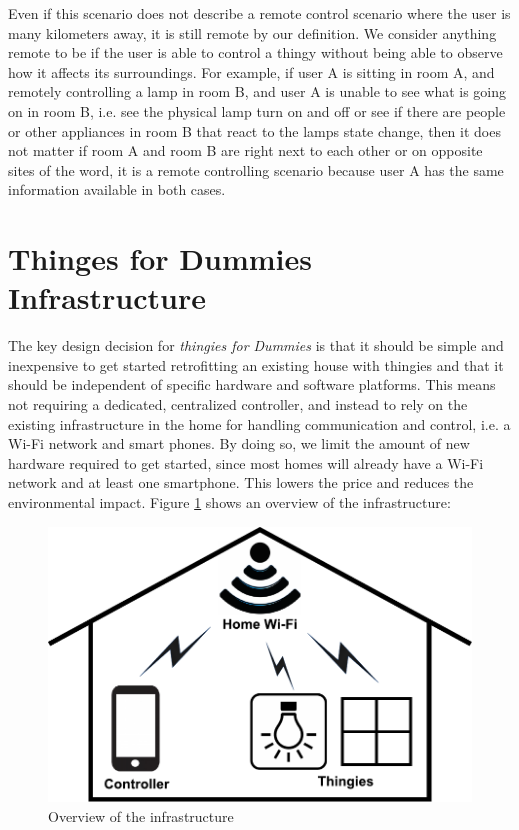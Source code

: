 \documentclass{ubicomp2012}
\begin{document}
Even if this scenario does not describe a remote control scenario where the user is many kilometers away, it is still remote by our definition. We consider anything remote to be if the user is able to control a thingy without being able to observe how it affects its surroundings. For example,  if user A is sitting in room A, and remotely controlling a lamp in room B, and user A is unable to see what is going on in room B, i.e. see the physical lamp turn on and off or see if there are people or other appliances in room B that react to the lamps state change, then it does not matter if room A and room B are right next to each other or on opposite sites of the word, it is a remote controlling scenario because user A has the same information available in both cases.

\section{Thinges for Dummies Infrastructure}
The key design decision for \textit{thingies for Dummies} is that it should be simple and  inexpensive to get started retrofitting an existing house with thingies and that it should be independent of specific hardware and software platforms. This means not requiring a dedicated, centralized controller, and instead to rely on the existing infrastructure in the home for handling communication and control, i.e. a Wi-Fi network and smart phones. By doing so, we limit the amount of new hardware required to get started, since most homes will already have a Wi-Fi network and at least one smartphone. This lowers the price and reduces the environmental impact. Figure \ref{fig:infrastructureOverview} shows an overview of the infrastructure:

\begin{figure}[th]
\begin{center}
\includegraphics[width=0.90\columnwidth]{figures/systemoverviewdrawing.pdf}
\end{center}
\caption{Overview of the infrastructure}
\label{fig:infrastructureOverview}
\end{figure}
\end{document}
